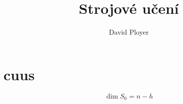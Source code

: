 \documentclass{article}
\title{Strojové učení}
\author{David Ployer}
\begin{document}
\maketitle

\section{cuus}

$$\dim S_0=n-h$$
\end{document}
